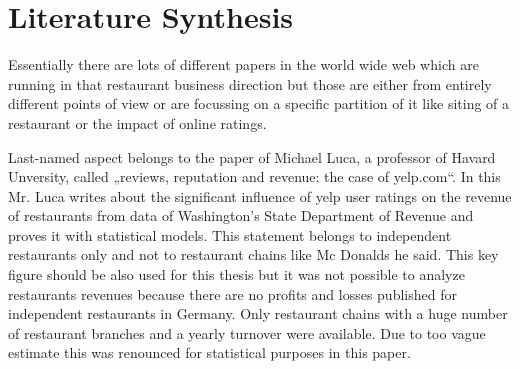 \section{Literature Synthesis}
\label{sec:synthesis}
Essentially there are lots of different papers in the world wide web which are running in that restaurant business direction but those are either from entirely different points of view or are focussing on a specific partition of it like siting of a restaurant or the impact of online ratings. 

Last-named aspect belongs to the paper of Michael Luca, a professor of Havard Unversity, called „reviews, reputation and revenue: the case of yelp.com“. In this Mr. Luca writes about the significant influence of yelp user ratings on the revenue of restaurants from data of Washington’s State Department of Revenue and proves it with statistical models. This statement belongs to independent restaurants only and not to restaurant chains like Mc Donalds he said. This key figure should be also used for this thesis but it was not possible to analyze restaurants revenues because there are no profits and losses published for independent restaurants in Germany. Only restaurant chains with a huge number of restaurant branches and a yearly turnover were available. Due to too vague estimate this was renounced for statistical purposes in this paper.

